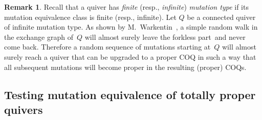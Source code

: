 \documentclass[11pt, letterpaper]{amsart}
\newcommand{\cS}[1]{{\noindent\textsf{\color{purple}$\blacksquare$~#1~$\blacksquare$}}}
\newcommand{\hide}[1]{}
\theoremstyle{definition}
\newtheorem{remark}[theorem]{Remark}
\numberwithin{equation}{section}
\begin{document}
\begin{remark}
\label{rem:random-walk-in-exchange-graph}
Recall that a quiver has \emph{finite} (resp., \emph{infinite}) \emph{mutation type}
if its mutation equivalence class is finite (resp., infinite). 
%
%
%
Let $Q$ be a connected quiver of infinite mutation type. 
As shown by M.~Warkentin~\cite[Proposition~5.2]{Warkentin}, 
a simple random walk in the exchange graph of~$Q$ 
will almost surely leave the forkless part~and never come back.
Therefore a random sequence of mutations starting at~$Q$
will almost surely reach a quiver that can be upgraded to a proper COQ in such a way that 
all subsequent mutations will become proper in the resulting (proper) COQs. 
\hide{
Let 
\begin{equation*}
Q=Q_0 \stackrel{\mu_{v_1}}{\longrightarrow} Q_1 \stackrel{\mu_{v_2}}{\longrightarrow} Q_2
\stackrel{\mu_{v_3}}{\longrightarrow}  \cdots 
\end{equation*}
be a simple random walk in the exchange graph of~$Q$.
As shown by M.~Warkentin~\cite[Proposition~5.2]{Warkentin}, 
with probability~1 there exists $N>0$ such that every quiver $Q_n$ with $n>N$ is a fork. 
In particular, every $Q_n$ with $n>N$ 
has a unique proper cyclic ordering---so all mutations $\mu_{v_n}$ for $n>N$ are proper. 
}%
\end{remark}


\subsection*{Testing mutation equivalence of totally proper quivers}
\end{document}
